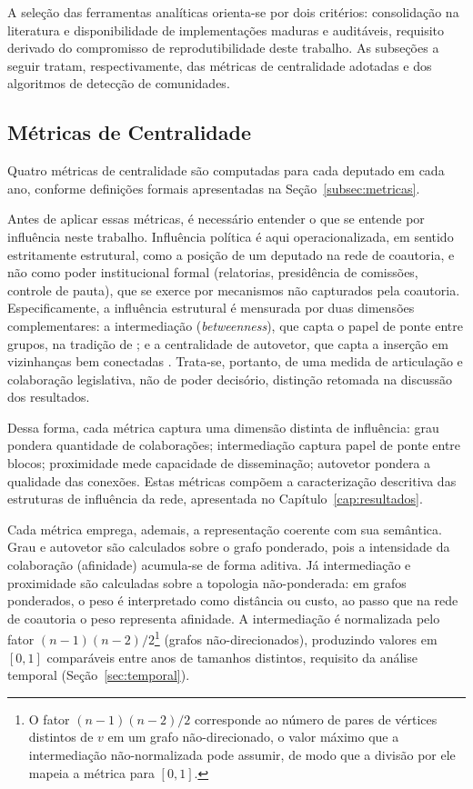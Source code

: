 \documentclass[
      12pt,
      a4paper,
      openright,
      oneside,
      chapter=TITLE,
      section=TITLE,
      english,
      french,
      spanish,
      brazilian
    ]{abntex2}
\begin{document}
    A seleção das ferramentas analíticas orienta-se por dois critérios: consolidação
    na literatura e disponibilidade de implementações maduras e auditáveis, requisito
    derivado do compromisso de reprodutibilidade deste trabalho. As subseções a
    seguir tratam, respectivamente, das métricas de centralidade adotadas e dos
    algoritmos de detecção de comunidades.
    
    \subsection{Métricas de Centralidade}
    
    Quatro métricas de centralidade são computadas para cada deputado em cada ano, conforme definições formais apresentadas na Seção~\ref{subsec:metricas}.
    
    Antes de aplicar essas métricas, é necessário entender o que se entende por influência neste trabalho. Influência política é aqui operacionalizada, em sentido estritamente estrutural, como a posição de um deputado na rede de coautoria, e não como poder institucional formal (relatorias, presidência de comissões, controle de pauta), que se exerce por mecanismos não capturados pela coautoria. Especificamente, a influência estrutural é mensurada por duas dimensões complementares: a intermediação (\textit{betweenness}), que capta o papel de ponte entre grupos, na tradição de ; e a centralidade de autovetor, que capta a inserção em vizinhanças bem conectadas \cite{bonacich1972}. Trata-se, portanto, de uma medida de articulação e colaboração legislativa, não de poder decisório, distinção retomada na discussão dos resultados.
    
    Dessa forma, cada métrica captura uma dimensão distinta de influência: grau pondera quantidade de colaborações; intermediação captura papel de ponte entre blocos; proximidade mede capacidade de disseminação; autovetor pondera a qualidade das conexões. Estas métricas compõem a caracterização descritiva das estruturas de influência da rede, apresentada no Capítulo~\ref{cap:resultados}.
    
    Cada métrica emprega, ademais, a representação coerente com sua semântica. Grau e autovetor são calculados sobre o grafo ponderado, pois a intensidade da colaboração (afinidade) acumula-se de forma aditiva. Já intermediação e proximidade são calculadas sobre a topologia não-ponderada: em grafos ponderados, o peso é interpretado como distância ou custo, ao passo que na rede de coautoria o peso representa afinidade. A intermediação é normalizada pelo fator $(n-1)(n-2)/2$\footnote{O fator $(n-1)(n-2)/2$ corresponde ao número de pares de vértices distintos de $v$ em um grafo não-direcionado, o valor máximo que a intermediação não-normalizada pode assumir, de modo que a divisão por ele mapeia a métrica para $[0,1]$.} (grafos não-direcionados), produzindo valores em $[0,1]$ comparáveis entre anos de tamanhos distintos, requisito da análise temporal (Seção~\ref{sec:temporal}).
    
\end{document}
